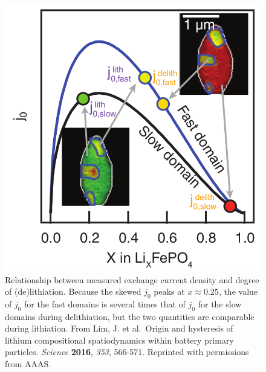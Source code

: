 \documentclass[journal=cmatex,manuscript=perspective]{achemso}
\begin{document}
\begin{figure}
  \includegraphics[width=\textwidth]{lim2016.png}
  \caption{Relationship between measured exchange current density and
    degree of (de)lithiation. Because the skewed $j_0$ peaks at $x
    \approx 0.25$, the value of $j_0$ for the fast domains is several
    times that of $j_0$ for the slow domains during delithiation, but
    the two quantities are comparable during lithiation. From Lim,
    J. et al.\ Origin and hysteresis of lithium compositional
    spatiodynamics within battery primary particles. \textit{Science}
    \textbf{2016}, \textit{353}, 566-571. Reprinted with permissions
    from AAAS.}
  \label{figure:lim2016}
\end{figure}
\end{document}
